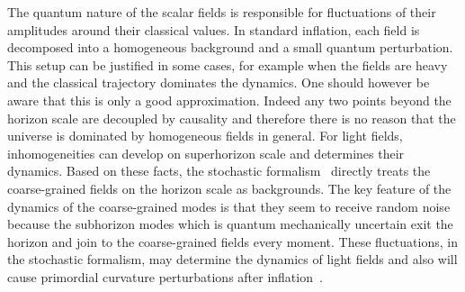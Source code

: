 \documentclass[a4paper,11pt]{article}
\begin{document}
The quantum nature of the scalar fields is responsible for fluctuations of their amplitudes around their classical values. 
In standard inflation, each field is decomposed into a homogeneous background and a small quantum perturbation. 
This setup can be justified in some cases, for example when the fields are heavy and the classical trajectory dominates the dynamics. 
One should however be aware that this is only a good approximation. 
Indeed any two points beyond the horizon scale are decoupled by causality and therefore there is no reason that the universe is dominated by
homogeneous fields in general. For light fields, inhomogeneities can develop on superhorizon scale and determines their dynamics.
Based on these facts, the stochastic formalism~\cite{Starobinsky:1986fx,Nambu:1987ef,Nambu:1988je,Kandrup:1988sc,Nakao:1988yi,
Nambu:1989uf,Mollerach:1990zf,Linde:1993xx,Starobinsky:1994bd,Rigopoulos:2004gr,Rigopoulos:2005xx,Finelli:2008zg,Finelli:2010sh} 
directly treats the coarse-grained fields on
the horizon scale as backgrounds.
The key feature of the dynamics of the coarse-grained modes is that
they seem to receive random noise because the subhorizon modes which is quantum mechanically uncertain exit the horizon and 
join to the coarse-grained fields every moment. 
These fluctuations, in the stochastic formalism, may determine the dynamics of light fields and also will cause primordial curvature perturbations
after inflation~\cite{Fujita:2013cna,Fujita:2014tja,Vennin:2015hra}.
\end{document}

